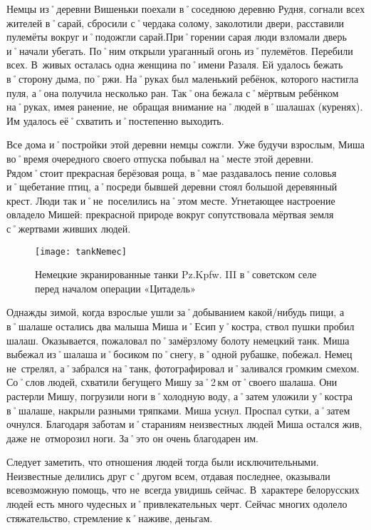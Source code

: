 Немцы из˚деревни Вишеньки поехали в˚соседнюю деревню Рудня, согнали всех жителей в˚сарай, сбросили с˚чердака солому, заколотили двери, расставили пулемёты вокруг и˚подожгли сарай.При˚горении сарая люди взломали дверь и˚начали убегать. По˚ним открыли ураганный огонь из˚пулемётов. Перебили всех. В~живых осталась одна женщина по˚имени Разаля. Ей удалось бежать в˚сторону дыма, по˚ржи. На˚руках был маленький ребёнок, которого настигла пуля, а˚она получила несколько ран. Так˚она бежала с˚мёртвым ребёнком на˚руках, имея ранение, не~обращая внимание на˚людей в˚шалашах (куренях). Им удалось её˚схватить и˚постепенно выходить. 

Все дома и˚постройки этой деревни немцы сожгли. Уже будучи взрослым, Миша во˚время очередного своего отпуска побывал на˚месте этой деревни. Рядом˚стоит прекрасная берёзовая роща, в˚мае раздавалось пение соловья и˚щебетание птиц, а˚посреди бывшей деревни стоял большой деревянный крест. Люди так и˚не~поселились на˚этом месте. Угнетающее настроение овладело Мишей: прекрасной природе вокруг сопутствовала мёртвая земля с˚жертвами живших людей. 

\begin{wrapfigure}{O}{.4\textwidth}
\centering
\texttt{[image: tankNemec]}
\caption{Немецкие экранированные танки Pz.Kpfw. III в˚советском селе перед началом операции «Цитадель»}
\label{fig:tankNemec}
\end{wrapfigure}

Однажды зимой, когда взрослые ушли за˚добыванием какой\-/нибудь пищи, а в˚шалаше остались два малыша Миша и˚Есип у˚костра, ствол пушки пробил шалаш. Оказывается, пожаловал по˚замёрзлому болоту немецкий танк. Миша выбежал из˚шалаша и˚босиком по˚снегу, в˚одной рубашке, побежал. Немец не~стрелял, а˚забрался на˚танк, фотографировал и˚заливался громким смехом. Со˚слов людей, схватили бегущего Мишу за˚2\,км от˚своего шалаша. Они растерли Мишу, погрузили ноги в˚холодную воду, а˚затем уложили у˚костра в˚шалаше, накрыли разными тряпками. Миша уснул. Проспал сутки, а˚затем очнулся. Благодаря заботам и˚стараниям неизвестных людей Миша остался жив, даже не~отморозил ноги. За˚это он очень благодарен им.

Следует заметить, что отношения людей тогда были исключительными. Неизвестные делились друг с˚другом всем, отдавая последнее, оказывали всевозможную помощь, что не~всегда увидишь сейчас. В~характере белорусских людей есть много чудесных и˚привлекательных черт. Сейчас многих одолело стяжательство, стремление к˚наживе, деньгам.

